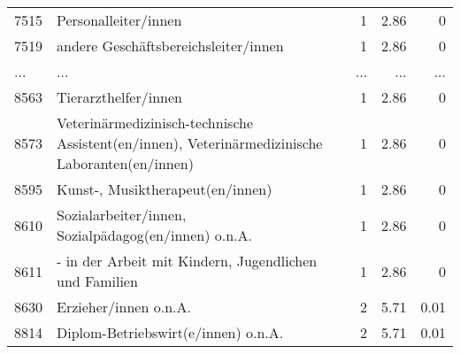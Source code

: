 \begin{longtable}{lXrrr}
        7515 & \multicolumn{1}{X}{Personalleiter/innen} & %
          \num{1} &
          \num[round-mode=places,round-precision=2]{2.86} &
          \num[round-mode=places,round-precision=2]{0} \\
        7519 & \multicolumn{1}{X}{andere Geschäftsbereichsleiter/innen} & %
          \num{1} &
          \num[round-mode=places,round-precision=2]{2.86} &
          \num[round-mode=places,round-precision=2]{0} \\
       ... & ... & ... & ... & ... \\
        8563 & \multicolumn{1}{X}{Tierarzthelfer/innen} & %
          \num{1} &
          \num[round-mode=places,round-precision=2]{2.86} &
          \num[round-mode=places,round-precision=2]{0} \\

        8573 & \multicolumn{1}{X}{Veterinärmedizinisch-technische Assistent(en/innen), Veterinärmedizinische Laboranten(en/innen)} & %
          \num{1} &
          \num[round-mode=places,round-precision=2]{2.86} &
          \num[round-mode=places,round-precision=2]{0} \\

        8595 & \multicolumn{1}{X}{Kunst-, Musiktherapeut(en/innen)} & %
          \num{1} &
          \num[round-mode=places,round-precision=2]{2.86} &
          \num[round-mode=places,round-precision=2]{0} \\

        8610 & \multicolumn{1}{X}{Sozialarbeiter/innen, Sozialpädagog(en/innen) o.n.A.} & %
          \num{1} &
          \num[round-mode=places,round-precision=2]{2.86} &
          \num[round-mode=places,round-precision=2]{0} \\

        8611 & \multicolumn{1}{X}{- in der Arbeit mit Kindern, Jugendlichen und Familien} & %
          \num{1} &
          \num[round-mode=places,round-precision=2]{2.86} &
          \num[round-mode=places,round-precision=2]{0} \\

        8630 & \multicolumn{1}{X}{Erzieher/innen o.n.A.} & %
          \num{2} &
          \num[round-mode=places,round-precision=2]{5.71} &
          \num[round-mode=places,round-precision=2]{0.01} \\

        8814 & \multicolumn{1}{X}{Diplom-Betriebswirt(e/innen) o.n.A.} & %
          \num{2} &
          \num[round-mode=places,round-precision=2]{5.71} &
          \num[round-mode=places,round-precision=2]{0.01} \\


\end{longtable}
